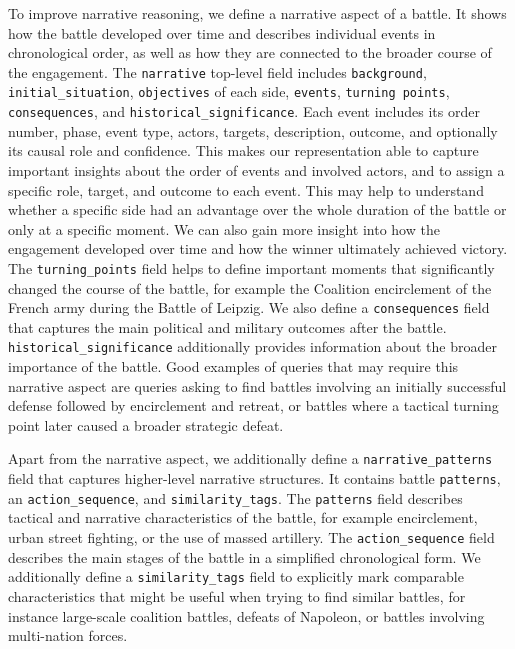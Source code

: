 To improve narrative reasoning, we define a narrative aspect of a battle. It shows how the battle developed over time and describes individual events in chronological order, as well as how they are connected to the broader course of the engagement. The \texttt{narrative} top-level field includes \texttt{background}, \texttt{initial\_situation}, \texttt{objectives} of each side, \texttt{events}, \texttt{turning points}, \texttt{consequences}, and \texttt{historical\_significance}. Each event includes its order number, phase, event type, actors, targets, description, outcome, and optionally its causal role and confidence. This makes our representation able to capture important insights about the order of events and involved actors, and to assign a specific role, target, and outcome to each event. This may help to understand whether a specific side had an advantage over the whole duration of the battle or only at a specific moment. We can also gain more insight into how the engagement developed over time and how the winner ultimately achieved victory. The \texttt{turning\_points} field helps to define important moments that significantly changed the course of the battle, for example the Coalition encirclement of the French army during the Battle of Leipzig. We also define a \texttt{consequences} field that captures the main political and military outcomes after the battle. \texttt{historical\_significance} additionally provides information about the broader importance of the battle. Good examples of queries that may require this narrative aspect are queries asking to find battles involving an initially successful defense followed by encirclement and retreat, or battles where a tactical turning point later caused a broader strategic defeat.

Apart from the narrative aspect, we additionally define a \texttt{narrative\_patterns} field that captures higher-level narrative structures. It contains battle \texttt{patterns}, an \texttt{action\_sequence}, and \texttt{similarity\_tags}. The \texttt{patterns} field describes tactical and narrative characteristics of the battle, for example encirclement, urban street fighting, or the use of massed artillery. The \texttt{action\_sequence} field describes the main stages of the battle in a simplified chronological form. We additionally define a \texttt{similarity\_tags} field to explicitly mark comparable characteristics that might be useful when trying to find similar battles, for instance large-scale coalition battles, defeats of Napoleon, or battles involving multi-nation forces.

